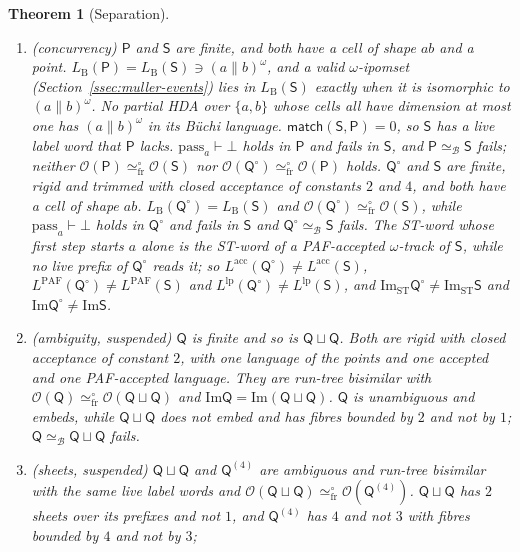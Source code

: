 \documentclass{lmcs}
\newtheorem{theorem}{Theorem}[section]
\theoremstyle{definition}
\theoremstyle{remark}
\newcommand{\Op}{\mathcal{O}}
\newcommand{\ab}{\{a,b\}}
\newcommand{\eqFrF}{\simeq^{\circ}_{\mathrm{fr}}}
\providecommand{\LB}[1]{L_{\mathrm{B}}(#1)}
\providecommand{\dsum}{\sqcup}
\providecommand{\LangA}[1]{L^{\mathrm{acc}}(#1)}
\providecommand{\LangPAF}[1]{L^{\mathrm{PAF}}(#1)}
\providecommand{\LangLp}[1]{L^{\mathrm{lp}}(#1)}
\providecommand{\matchB}{\mathsf{match}}
\providecommand{\wQ}{\mathsf{Q}}
\providecommand{\eqB}{\simeq_{\mathcal{B}}}
\providecommand{\Ima}{\mathrm{Im}}
\providecommand{\ImaST}{\mathrm{Im}_{\mathrm{ST}}}
\providecommand{\dsum}{\sqcup}
\providecommand{\wQ}{\mathsf{Q}}
\begin{document}
\begin{theorem}[Separation]\label{thm:separation}\label{thm:image-sq}\label{thm:image-concurrency}\label{thm:image-incomparable}\label{prop:lang-not-image}\label{thm:pair}
\begin{enumerate}[nosep]
\item (\emph{concurrency}) $\mathsf P$ and $\mathsf S$ are finite, and both have a cell of
  shape $ab$ and a point. $\LB{\mathsf P}=\LB{\mathsf S}\ni(a\parallel b)^\omega$, and a valid $\omega$-ipomset
  (Section~\ref{ssec:muller-events}) lies
  in $\LB{\mathsf S}$ exactly when it is isomorphic to $(a\parallel
  b)^\omega$. No partial HDA over $\ab$ whose cells all have
  dimension at most one has $(a\parallel b)^\omega$ in its B\"uchi
  language. $\matchB(\mathsf S,\mathsf P)=0$, so $\mathsf S$ has a live label word
  that $\mathsf P$ lacks. $\mathrm{pass}_a\vdash\bot$ holds in $\mathsf P$ and fails in
  $\mathsf S$, and $\mathsf P\eqB\mathsf S$ fails; neither
  $\Op(\mathsf P)\eqFrF\Op(\mathsf S)$ nor $\Op(\wQ^\circ)\eqFrF\Op(\mathsf P)$ holds.
  $\wQ^\circ$ and $\mathsf S$ are finite, rigid and trimmed with closed acceptance of constants $2$ and $4$, and both have
  a cell of shape $ab$. $\LB{\wQ^\circ}=\LB{\mathsf S}$ and
  $\Op(\wQ^\circ)\eqFrF\Op(\mathsf S)$, while
  $\mathrm{pass}_a\vdash\bot$ holds in $\wQ^\circ$ and fails in $\mathsf S$ and $\wQ^\circ\eqB\mathsf S$
  fails. The ST-word whose first step starts $a$ alone is the ST-word of a PAF-accepted
  $\omega$-track of $\mathsf S$, while no live prefix of $\wQ^\circ$ reads it; so
  $\LangA{\wQ^\circ}\neq\LangA{\mathsf S}$, $\LangPAF{\wQ^\circ}\neq\LangPAF{\mathsf S}$ and
  $\LangLp{\wQ^\circ}\neq\LangLp{\mathsf S}$, and $\ImaST\wQ^\circ\neq\ImaST\mathsf S$ and
  $\Ima\wQ^\circ\neq\Ima\mathsf S$.
\item (\emph{ambiguity, suspended}) $\wQ$ is finite and so is $\wQ\dsum
  \wQ$. Both are rigid with closed acceptance of constant $2$, with one language of the points and
  one accepted and one PAF-accepted language. They are run-tree bisimilar with
  $\Op(\wQ)\eqFrF\Op(\wQ\dsum \wQ)$ and $\Ima
  \wQ=\Ima(\wQ\dsum \wQ)$. $\wQ$ is unambiguous and
  embeds, while $\wQ\dsum \wQ$ does not embed and
  has fibres bounded by $2$ and not by $1$;
  $\wQ\eqB \wQ\dsum \wQ$ fails.
\item (\emph{sheets, suspended}) $\wQ\dsum \wQ$ and $\wQ^{(4)}$ are ambiguous and run-tree bisimilar with the same
  live label words and $\Op(\wQ\dsum \wQ)\eqFrF\Op(\wQ^{(4)})$. $\wQ\dsum \wQ$ has $2$ sheets over its prefixes and not
  $1$, and $\wQ^{(4)}$ has $4$ and not $3$ with fibres bounded by $4$ and not by $3$;

\end{enumerate}
\end{theorem}
\end{document}
